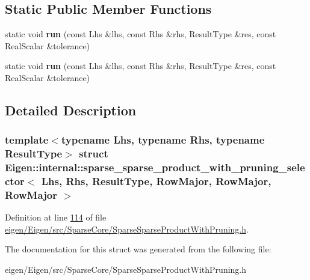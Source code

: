 \subsection*{Static Public Member Functions}
\begin{DoxyCompactItemize}
\item 
\mbox{\label{struct_eigen_1_1internal_1_1sparse__sparse__product__with__pruning__selector_3_01_lhs_00_01_rhs_ac6a83f16fa8af56c1b06b928dbc0536_a6570dcb375260e10571ddc92e4989698}} 
static void {\bfseries run} (const Lhs \&lhs, const Rhs \&rhs, Result\+Type \&res, const Real\+Scalar \&tolerance)
\item 
\mbox{\label{struct_eigen_1_1internal_1_1sparse__sparse__product__with__pruning__selector_3_01_lhs_00_01_rhs_ac6a83f16fa8af56c1b06b928dbc0536_a6570dcb375260e10571ddc92e4989698}} 
static void {\bfseries run} (const Lhs \&lhs, const Rhs \&rhs, Result\+Type \&res, const Real\+Scalar \&tolerance)
\end{DoxyCompactItemize}


\subsection{Detailed Description}
\subsubsection*{template$<$typename Lhs, typename Rhs, typename Result\+Type$>$\newline
struct Eigen\+::internal\+::sparse\+\_\+sparse\+\_\+product\+\_\+with\+\_\+pruning\+\_\+selector$<$ Lhs, Rhs, Result\+Type, Row\+Major, Row\+Major, Row\+Major $>$}



Definition at line \hyperlink{eigen_2_eigen_2src_2_sparse_core_2_sparse_sparse_product_with_pruning_8h_source_l00114}{114} of file \hyperlink{eigen_2_eigen_2src_2_sparse_core_2_sparse_sparse_product_with_pruning_8h_source}{eigen/\+Eigen/src/\+Sparse\+Core/\+Sparse\+Sparse\+Product\+With\+Pruning.\+h}.



The documentation for this struct was generated from the following file\+:\begin{DoxyCompactItemize}
\item 
eigen/\+Eigen/src/\+Sparse\+Core/\+Sparse\+Sparse\+Product\+With\+Pruning.\+h\end{DoxyCompactItemize}
